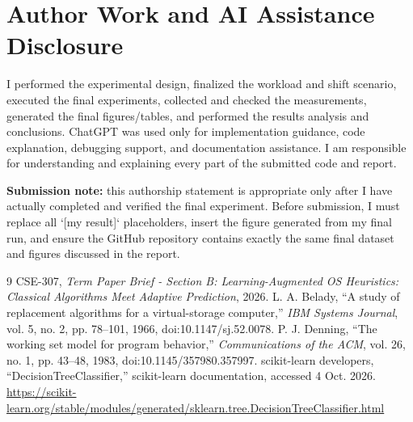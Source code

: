 \documentclass[10pt]{article}
\begin{document}
\section{Author Work and AI Assistance Disclosure}
I performed the experimental design, finalized the workload and shift scenario, executed the final experiments, collected and checked the measurements, generated the final figures/tables, and performed the results analysis and conclusions. ChatGPT was used only for implementation guidance, code explanation, debugging support, and documentation assistance. I am responsible for understanding and explaining every part of the submitted code and report.

\textbf{Submission note:} this authorship statement is appropriate only after I have actually completed and verified the final experiment. Before submission, I must replace all `[my result]` placeholders, insert the figure generated from my final run, and ensure the GitHub repository contains exactly the same final dataset and figures discussed in the report.

\begin{thebibliography}{9}
 CSE-307, \emph{Term Paper Brief - Section B: Learning-Augmented OS Heuristics: Classical Algorithms Meet Adaptive Prediction}, 2026.
 L. A. Belady, ``A study of replacement algorithms for a virtual-storage computer,'' \emph{IBM Systems Journal}, vol. 5, no. 2, pp. 78--101, 1966, doi:10.1147/sj.52.0078.
 P. J. Denning, ``The working set model for program behavior,'' \emph{Communications of the ACM}, vol. 26, no. 1, pp. 43--48, 1983, doi:10.1145/357980.357997.
 scikit-learn developers, ``DecisionTreeClassifier,'' scikit-learn documentation, accessed 4 Oct. 2026. \url{https://scikit-learn.org/stable/modules/generated/sklearn.tree.DecisionTreeClassifier.html}
\end{thebibliography}
\end{document}
